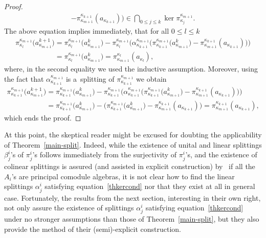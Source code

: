 \documentclass[11pt]{article}
\begin{document}
\begin{proof}
\begin{gather*}
-\pi^{\kappa_{k+1}}_{\kappa_{m+1}}(a_{\kappa_{k+1}})
\big)\in \bigcap_{0\leq j\leq k}\ker\pi^{\kappa_{m+1}}_{\kappa_j}.
\end{gather*}
The above equation implies immediately, that for all $0\leq l\leq k$
\begin{gather*}
\pi^{\kappa_{m+1}}_{\kappa_l}\big(a^{k+1}_{\kappa_{m+1}}\big)
= \pi^{\kappa_{m+1}}_{\kappa_l}\big(a_{\kappa_{m+1}}^k\big)-\pi^{\kappa_{m+1}}_{\kappa_l}\big(\alpha^{\kappa_{m+1}}_{\kappa_{k+1}}
\big(\pi^{\kappa_{m+1}}_{\kappa_{k+1}}\big(a^k_{\kappa_{m+1}}\big)-\pi^{\kappa_{k+1}}_{\kappa_{m+1}}(a_{\kappa_{k+1}})\big)\big)
\\
\phantom{\pi^{\kappa_{m+1}}_{\kappa_l}\big(a^{k+1}_{\kappa_{m+1}}\big)}{}
 =\pi^{\kappa_{m+1}}_{\kappa_l}\big(a_{\kappa_{m+1}}^k\big)
 =\pi^{\kappa_l}_{\kappa_{m+1}}(a_{\kappa_l}),
\end{gather*}
where, in the second equality we used the inductive assumption.
Moreover, using the fact that $\alpha^{\kappa_{m+1}}_{\kappa_{k+1}}$ is a~splitting of
$\pi^{\kappa_{m+1}}_{\kappa_{k+1}}$ we obtain
\begin{gather*}
\pi^{\kappa_{m+1}}_{\kappa_{k+1}}\big(a^{k+1}_{\kappa_{m+1}}\big)
= \pi^{\kappa_{m+1}}_{\kappa_{k+1}}\big(a_{\kappa_{m+1}}^k\big)-\pi^{\kappa_{m+1}}_{\kappa_{k+1}}\big(\alpha^{\kappa_{m+1}}_{\kappa_{k+1}}
\big(\pi^{\kappa_{m+1}}_{\kappa_{k+1}}\big(a^k_{\kappa_{m+1}}\big)-\pi^{\kappa_{k+1}}_{\kappa_{m+1}}(a_{\kappa_{k+1}})\big)\big)
\\
\phantom{\pi^{\kappa_{m+1}}_{\kappa_{k+1}}\big(a^{k+1}_{\kappa_{m+1}}\big)}
 =\pi^{\kappa_{m+1}}_{\kappa_{k+1}}\big(a_{\kappa_{m+1}}^k\big) -
\big(\pi^{\kappa_{m+1}}_{\kappa_{k+1}}\big(a^k_{\kappa_{m+1}}\big)-\pi^{\kappa_{k+1}}_{\kappa_{m+1}}(a_{\kappa_{k+1}})\big)
 =\pi^{\kappa_{k+1}}_{\kappa_{m+1}}(a_{\kappa_{k+1}}),
\end{gather*}
which ends the proof.
\end{proof}

At this point, the skeptical reader might be excused for doubting the applicability of Theorem~\ref{main-split}.
Indeed, while the existence of unital and linear splittings $\beta^i_j$'s of $\pi^i_j$'s follows immediately from the
surjectivity of $\pi^i_j$'s, and the existence of colinear splittings is assured (and assisted in explicit construction)
by~\cite[Lemma~3.1]{hkmz11} if all the $A_i$'s are principal comodule algebras, it is not clear how to f\/ind the linear
splittings $\alpha^i_j$ satisfying equation~\eqref{thkercond} nor that they exist at all in general case.
Fortunately, the results from the next section, interesting in their own right, not only assure the existence of
splittings $\alpha^i_j$ satisfying equation~\eqref{thkercond} under no stronger assumptions than those of
Theorem~\ref{main-split}, but they also provide the method of their (semi)-explicit construction.
\end{document}

